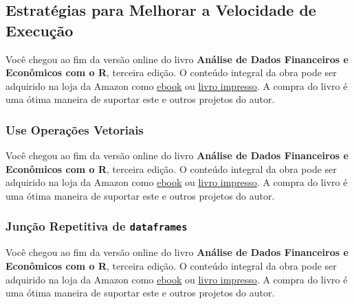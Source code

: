 \documentclass[
  11pt,
]{book}
\newenvironment{pleasebuyit}
{\begin{noteblock}
		
	} {\end{noteblock}}
\begin{document}
\hypertarget{estratuxe9gias-para-melhorar-a-velocidade-de-execuuxe7uxe3o}{%
\subsection{Estratégias para Melhorar a Velocidade de Execução}\label{estratuxe9gias-para-melhorar-a-velocidade-de-execuuxe7uxe3o}}

\begin{pleasebuyit}
Você chegou ao fim da versão online do livro \textbf{Análise de Dados
Financeiros e Econômicos com o R}, terceira edição. O conteúdo integral
da obra pode ser adquirido na loja da Amazon como
\href{https://www.amazon.com.br/dp/B08WNC27ZY}{ebook} ou
\href{https://www.amazon.com/dp/B08WP8CCDB}{livro impresso}. A compra do
livro é uma ótima maneira de suportar este e outros projetos do autor.
\end{pleasebuyit}

\hypertarget{use-operauxe7uxf5es-vetoriais}{%
\subsubsection{Use Operações Vetoriais}\label{use-operauxe7uxf5es-vetoriais}}

\begin{pleasebuyit}
Você chegou ao fim da versão online do livro \textbf{Análise de Dados
Financeiros e Econômicos com o R}, terceira edição. O conteúdo integral
da obra pode ser adquirido na loja da Amazon como
\href{https://www.amazon.com.br/dp/B08WNC27ZY}{ebook} ou
\href{https://www.amazon.com/dp/B08WP8CCDB}{livro impresso}. A compra do
livro é uma ótima maneira de suportar este e outros projetos do autor.
\end{pleasebuyit}

\hypertarget{junuxe7uxe3o-repetitiva-de-dataframes}{%
\subsubsection{\texorpdfstring{Junção Repetitiva de \texttt{dataframes}}{Junção Repetitiva de dataframes}}\label{junuxe7uxe3o-repetitiva-de-dataframes}}

\begin{pleasebuyit}
Você chegou ao fim da versão online do livro \textbf{Análise de Dados
Financeiros e Econômicos com o R}, terceira edição. O conteúdo integral
da obra pode ser adquirido na loja da Amazon como
\href{https://www.amazon.com.br/dp/B08WNC27ZY}{ebook} ou
\href{https://www.amazon.com/dp/B08WP8CCDB}{livro impresso}. A compra do
livro é uma ótima maneira de suportar este e outros projetos do autor.
\end{pleasebuyit}
\end{document}
